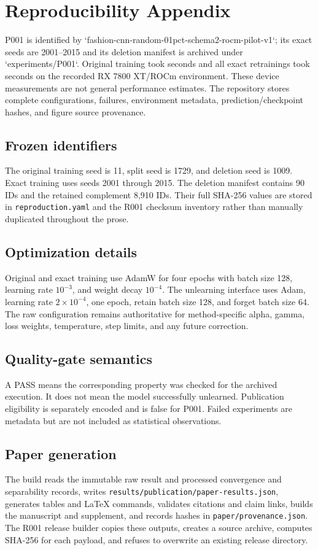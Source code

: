 \appendix
\section{Reproducibility Appendix}
P001 is identified by `fashion-cnn-random-01pct-schema2-rocm-pilot-v1`; its exact seeds are
2001--2015 and its deletion manifest is archived under `experiments/P001`. Original
training took \PilotOriginalSeconds{} seconds and all exact retrainings took
\PilotExactSeconds{} seconds on the recorded RX 7800 XT/ROCm environment. These device
measurements are not general performance estimates. The repository stores complete
configurations, failures, environment metadata, prediction/checkpoint hashes, and figure
source provenance.

\subsection{Frozen identifiers}
The original training seed is 11, split seed is 1729, and deletion seed is 1009. Exact
training uses seeds 2001 through 2015. The deletion manifest contains 90 IDs and the
retained complement 8,910 IDs. Their full SHA-256 values are stored in
\texttt{reproduction.yaml} and the R001 checksum inventory rather than manually duplicated
throughout the prose.

\subsection{Optimization details}
Original and exact training use AdamW for four epochs with batch size 128, learning rate
$10^{-3}$, and weight decay $10^{-4}$. The unlearning interface uses Adam, learning rate
$2\times10^{-4}$, one epoch, retain batch size 128, and forget batch size 64. The raw
configuration remains authoritative for method-specific alpha, gamma, loss weights,
temperature, step limits, and any future correction.

\subsection{Quality-gate semantics}
A PASS means the corresponding property was checked for the archived execution. It does
not mean the model successfully unlearned. Publication eligibility is separately encoded
and is false for P001. Failed experiments are metadata but are not included as statistical
observations.

\subsection{Paper generation}
The build reads the immutable raw result and processed convergence and separability records,
writes \texttt{results/publication/paper-results.json}, generates tables and LaTeX commands,
validates citations and claim links, builds the manuscript and supplement, and records
hashes in \texttt{paper/provenance.json}. The R001 release builder copies these outputs,
creates a source archive, computes SHA-256 for each payload, and refuses to overwrite an
existing release directory.

